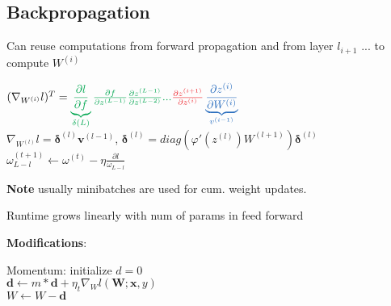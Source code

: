 \subsection{Backpropagation}

Can reuse computations from \color{NavyBlue} forward propagation \color{black} and from \color{Green} layer $l_{i+1}$ ... \color{black} to \color{Red} compute \color{black} $W^{(i)}$ 

\begin{center}
    $(\nabla_{W^{(i)}}l)^T  = \color{Green}\underbrace{\frac{\partial l}{\partial f}}_{\delta{(L)}}\frac{\partial f}{\partial z^{(L-1)}}\frac{\partial z^{(L-1)}}{\partial z^{(L-2)}}...\color{Red} \frac{\partial z^{(i+1)}}{\partial z^{(i)}}\color{NavyBlue}\underbrace{\frac{\partial z^{(i)}}{\partial W^{(i)}}}_{v^{(i-1)}}$\\
    $\nabla_{W^{(l)}}l = \boldsymbol{\delta}^{(l)}\boldsymbol{v}^{(l-1)}$, $\boldsymbol{\delta}^{(l)} = diag(\varphi'(z^{(l)})W^{(l+1)})\boldsymbol{\delta}^{(l)}$\\
    $\omega^{(t+1)}_{L-l} \leftarrow \omega^{(t)} - \eta \frac{\partial l}{\omega_{L-l}}$
\end{center}
\textbf{Note} usually minibatches are used for cum. weight updates.

Runtime grows linearly with num of params in feed forward

\textbf{Modifications}:
\begin{center}
    Momentum: initialize $d = 0$\\
    $\boldsymbol{d} \leftarrow m*\boldsymbol{d} + \eta_t\nabla_Wl(\boldsymbol{W};\boldsymbol{x},y)$\\
    $W \leftarrow W - \boldsymbol{d}$
\end{center}


